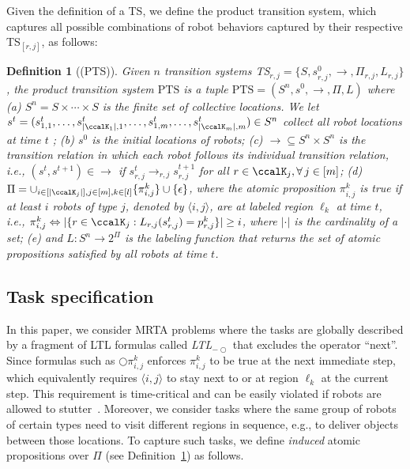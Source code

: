\documentclass[Afour,sageh,times]{sagej}
\newtheorem{defn}[thm]{Definition}
\newcommand{\ltl}{ {\it LTL}$_{-\bigcirc}$ }
\newcommand{\ag}[2]{\langle#1,#2\rangle}
\renewcommand{\ap}[3]{\mathcal{\pi}_{{#1},{#2}}^{#3}}
\begin{document}
Given the definition of a TS, we define the {product transition system}, which captures all possible combinations of robot behaviors captured by their respective TS$_{[r,j]}$, as follows:
\begin{defn}[(PTS)]\label{def:pts}
  Given $n$ transition systems TS$_{r,j} = \{S, s_{r,j}^0, \to, \Pi_{r,j}, L_{r,j}\}$, the product transition system $\text{PTS}$ is a tuple $\text{PTS} = (S^n, s^0, \to, \Pi, L)$ where (a) $S^n = S\times \cdots \times S$ is the finite set of collective locations. We let $s^t = (s_{1,1}^t, \ldots, s_{|\ccalK_1|,1}^t, \ldots, s_{1,m}^t, \ldots, s_{|\ccalK_m|, m}^t) \in S^n$ collect all robot locations at time $t$%
  ; (b) $s^0$ is the initial locations of robots; (c) $\to \subseteq S^n \times S^n$ is the transition relation in which each robot follows its individual transition relation, i.e., $(s^t, s^{t+1}) \in \to$ if $s^t_{r,j}\rightarrow_{r,j} s^{t+1}_{r,j}$ for all $r\in \ccalK_j, \forall \,j \in [m]$;
  (d) $\Pi = \cup_{i\in[|\ccalK_j|], j\in [m], k\in [l]}\{\pi_{i,j}^k\} \cup \{\epsilon\}$, where the atomic proposition $\ap{i}{j}{k}$ is true if at least $i$ robots of type $j$, denoted by $\ag{i}{j}$, are at labeled region $\ell_k$ at time $t$, i.e., $\ap{i}{j}{k} \Leftrightarrow |\{r\in \ccalK_j: L_{r,j}(s_{r,j}^t) = p_{r,j}^k \}| \geq i$, where $|\cdot|$ is the cardinality of a set; (e) and $L: S^n \to 2^{\Pi}$ is the labeling function that returns the set of atomic propositions satisfied by all robots at time $t$.
\end{defn}
\subsection{Task specification}
In this paper, we consider MRTA problems where the tasks are globally described by  a fragment of LTL formulas called \ltl that excludes the operator ``next''. Since formulas such as  $\bigcirc \ap{i}{j}{k}$ enforces $\ap{i}{j}{k}$ to be true at the next immediate step, which equivalently requires $\langle i,j \rangle$ to stay next to or at region $\ell_k$ at the current step. This requirement  is time-critical and can be easily violated if robots are allowed to stutter~\cite{sahin2019multirobot}. Moreover, we consider tasks where the same group of robots of certain types  need to visit different regions in sequence, e.g., to deliver objects between those locations. To capture such tasks, we  define {\it induced} atomic propositions over $\Pi$ (see Definition~\ref{def:pts})  as follows.
\end{document}
